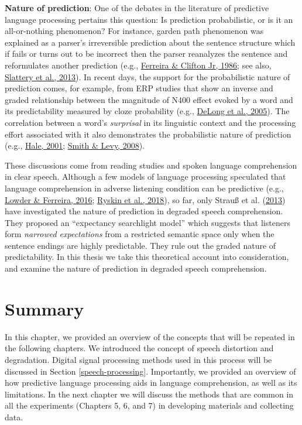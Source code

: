 \documentclass[a4paper, nobind]{templates/ociamthesis}
\begin{document}
\textbf{Nature of prediction}:
One of the debates in the literature of predictive language processing pertains this question: Is prediction probabilistic, or is it an all-or-nothing phenomenon?
For instance, garden path phenomenon was explained as a parser's irreversible prediction about the sentence structure
which if fails or turns out to be incorrect then the parser reanalyzes the sentence and reformulates another prediction (e.g., \protect\hyperlink{ref-Ferreira1986}{Ferreira \& Clifton Jr, 1986}; see also, \protect\hyperlink{ref-Slattery2013}{Slattery et al., 2013}).
In recent days, the support for the probabilistic nature of prediction comes, for example, from ERP studies that show an inverse and graded relationship between the magnitude of N400 effect evoked by a word and its predictability measured by cloze probability (e.g., \protect\hyperlink{ref-Delong2005}{DeLong et al., 2005}).
The correlation between a word's \emph{surprisal} in its linguistic context and the processing effort associated with it also demonstrates the probabilistic nature of prediction (e.g., \protect\hyperlink{ref-Hale2001}{Hale, 2001}; \protect\hyperlink{ref-Smith2008}{Smith \& Levy, 2008}).

These discussions come from reading studies and spoken language comprehension in clear speech.
Although a few models of language processing speculated that language comprehension in adverse listening condition can be predictive (e.g., \protect\hyperlink{ref-Lowder2016}{Lowder \& Ferreira, 2016}; \protect\hyperlink{ref-Ryskin2018}{Ryskin et al., 2018}),
so far, only Strauß et al. (\protect\hyperlink{ref-Strauss2013}{2013}) have investigated the nature of prediction in degraded speech comprehension.
They proposed an ``expectancy searchlight model'' which suggests that listeners form \emph{narrowed expectations} from a restricted semantic space only when the sentence endings are highly predictable.
They rule out the graded nature of predictability.
In this thesis we take this theoretical account into consideration,
and examine the nature of prediction in degraded speech comprehension.

\hypertarget{summary}{%
\section{Summary}\label{summary}}

In this chapter, we provided an overview of the concepts that will be repeated in the following chapters.
We introduced the concept of speech distortion and degradation.
Digital signal processing methods used in this process will be discussed in Section \ref{speech-processing}.
Importantly, we provided an overview of how predictive language processing aids in language comprehension,
as well as its limitations.
In the next chapter we will discuss the methods that are common in all the experiments (Chapters 5, 6, and 7) in developing materials and collecting data.
\end{document}
